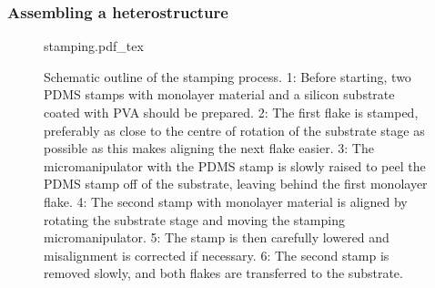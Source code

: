 \subsubsection{Assembling a heterostructure}
\begin{figure}[h]
	\centering
	\def\svgwidth{1\linewidth}
	{stamping.pdf_tex}
	\caption{Schematic outline of the stamping process. 1: Before starting, two PDMS stamps with monolayer material and a silicon substrate coated with PVA should be prepared. 2: The first flake is stamped, preferably as close to the centre of rotation of the substrate stage as possible as this makes aligning the next flake easier. 3: The micromanipulator with the PDMS stamp is slowly raised to peel the PDMS stamp off of the substrate, leaving behind the first monolayer flake. 4: The second stamp with monolayer material is aligned by rotating the substrate stage and moving the stamping micromanipulator. 5: The stamp is then carefully lowered and misalignment is corrected if necessary. 6: The second stamp is removed slowly, and both flakes are transferred to the substrate.}
	\label{fig:stamping_process}
\end{figure}

